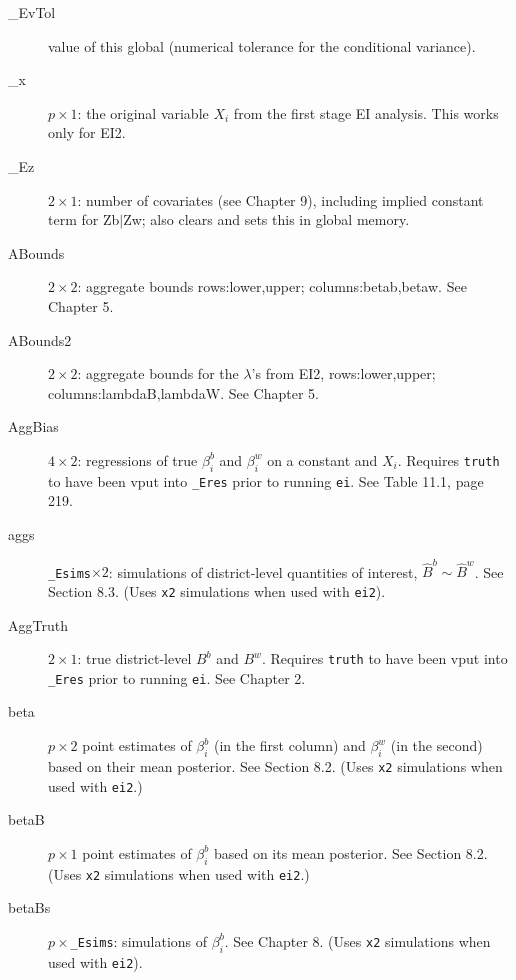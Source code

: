 \documentclass[11pt,titlepage]{article}
\begin{document}
\begin{description}
\item[\_EvTol] value of this global (numerical tolerance for the
  conditional variance).

\item[\_x] $p\times 1$: the original variable $X_i$ from the first
  stage EI analysis.  This works only for EI2.

\item[\_Ez] $2\times 1$: number of covariates (see Chapter 9),
  including implied constant term for Zb$\vert$Zw; also clears and
  sets this in global memory.

\item[ABounds] $2\times 2$: aggregate bounds rows:lower,upper;
  columns:betab,betaw.  See Chapter 5.

\item[ABounds2] $2\times 2$: aggregate bounds for the $\lambda$'s from
  EI2, rows:lower,upper; columns:lambdaB,lambdaW.  See Chapter 5.

\item[AggBias] $4\times 2$: regressions of true $\beta_i^b$ and
  $\beta_i^w$ on a constant and $X_i$.  Requires \texttt{truth} to
  have been vput into \texttt{\_Eres} prior to running \texttt{ei}.
  See Table 11.1, page 219.

\item[aggs] \texttt{\_Esims}$\times 2$: simulations of district-level
  quantities of interest, $\hat{B}^b\sim\hat{B}^w$.  See Section 8.3.
  (Uses \texttt{x2} simulations when used with \texttt{ei2}).

\item[AggTruth] $2\times 1$: true district-level $B^b$ and $B^w$.
  Requires \texttt{truth} to have been vput into \texttt{\_Eres} prior
  to running \texttt{ei}.  See Chapter 2.

\item[beta] $p\times 2$ point estimates of $\beta_i^b$ (in the first
  column) and $\beta_i^w$ (in the second) based on their mean
  posterior.  See Section 8.2.  (Uses \texttt{x2} simulations when
  used with \texttt{ei2}.)

\item[betaB] $p\times 1$ point estimates of $\beta_i^b$ based on its
  mean posterior.  See Section 8.2.  (Uses \texttt{x2}
  simulations when used with \texttt{ei2}.)

\item[betaBs] $p\times$\texttt{\_Esims}: simulations of $\beta_i^b$.
  See Chapter 8.  (Uses \texttt{x2} simulations when used
  with \texttt{ei2}).


\end{description}
\end{document}
